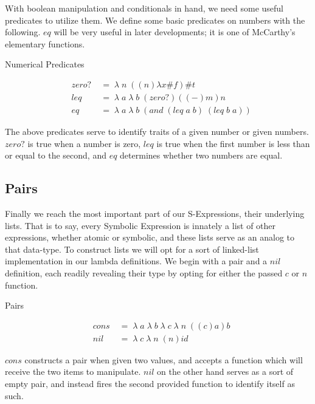 With boolean manipulation and conditionals in hand, we need some useful predicates 
to utilize them. We define some basic predicates on numbers with the following. 
$eq$ will be very useful in later developments; it is one of McCarthy's elementary 
functions.

Numerical Predicates
\begin{figure}[ht]
\caption{}\label{scheme}
\begin{align*}
& zero? \; &= \; \lambda \; n \; ((n)λx\#f)\#t
\\& leq \; &= \; \lambda \; a \; \lambda \; b \; (zero?)((-)m)n
\\& eq \; &= \; \lambda \; a \; \lambda \; b \; (and \; (leq \; a \; b) \; (leq \; b \; a))
\end{align*}
\end{figure}

The above predicates serve to identify traits of a given number or given numbers. 
$zero?$ is true when a number is zero, $leq$ is true when the first number is less 
than or equal to the second, and $eq$ determines whether two numbers are equal.

\subsection{Pairs}
Finally we reach the most important part of our S-Expressions, their underlying 
lists. That is to say, every Symbolic Expression is innately a list of other 
expressions, whether atomic or symbolic, and these lists serve as an analog to 
that data-type. To construct lists we will opt for a sort of linked-list 
implementation in our lambda definitions. We begin with a pair and a $nil$ 
definition, each readily revealing their type by opting for either the passed $c$ 
or $n$ function.

Pairs
\begin{figure}[ht]
\caption{}\label{scheme}
\begin{align*}
& cons \; &= \; \lambda \; a \; \lambda \; b \; \lambda \; c \; \lambda \; n \; ((c)a)b
\\& nil \; &= \; \lambda \; c \; \lambda \; n \; (n)id
\end{align*}
\end{figure}

$cons$ constructs a pair when given two values, and accepts a function which will 
receive the two items to manipulate. $nil$ on the other hand serves as a sort of 
empty pair, and instead fires the second provided function to identify itself as 
such.

